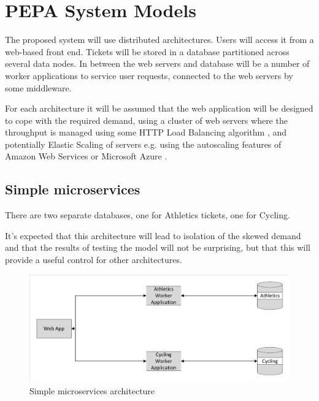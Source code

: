%
%

\section{PEPA System Models}\label{sec:pepa-system-models}
\begin{shaded}
The proposed system will use distributed architectures.  Users will access it from a web-based front end.  Tickets will be stored in a database partitioned across several data nodes.  In between the web servers and database will be a number of worker applications to service user requests, connected to the web servers by some middleware.

For each architecture it will be assumed that the web application will be designed to cope with the required demand, using a cluster of web servers where the throughput is managed using some HTTP Load Balancing algorithm \cite{RN73}, and potentially Elastic Scaling of servers e.g. using the autoscaling features of Amazon Web Services \cite{RN1064} or Microsoft Azure \cite{RN1065}.
\end{shaded}

%
%
\subsection{Simple microservices}

There are two separate databases, one for Athletics tickets, one for Cycling.

It's expected that this architecture will lead to isolation of the skewed demand and that the results of testing the model will not be surprising, but that this will provide a useful control for other architectures.

\begin{figure}
	\caption{Simple microservices architecture}
	\centering
	\includegraphics[trim = 5 5 5 5, clip, width=\textwidth]{img/simplemicro}
\end{figure}

